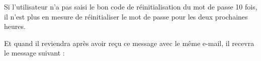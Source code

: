 \documentclass{article}
\begin{document}
\begin{enumerate}
   
  
\vspace{0.7cm}
               \hspace*{-0.7in}
               \noindent{} 



Si l'utilisateur n'a pas saisi le bon code de réinitialisation du mot de passe 10 fois, il n'est plus en mesure de réinitialiser le mot de passe pour les deux prochaines heures.



  
\vspace{0.7cm}
               \hspace*{-0.7in}
               \noindent{} 


Et quand il reviendra après avoir reçu ce message avec le même e-mail, il recevra le message suivant :


\end{enumerate}
\end{document}

